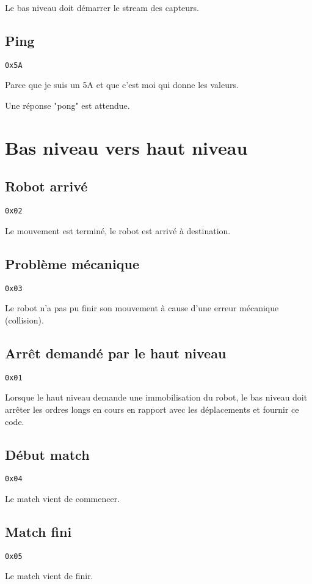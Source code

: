 \documentclass[a4paper, 12pt]{article}
\begin{document}
Le bas niveau doit démarrer le stream des capteurs.
    
\subsection{Ping}
    \texttt{0x5A}
    
    Parce que je suis un 5A et que c'est moi qui donne les valeurs.
    
    Une réponse "pong" est attendue.

\section{Bas niveau vers haut niveau}

\subsection{Robot arrivé}
    \texttt{0x02}
    
Le mouvement est terminé, le robot est arrivé à destination.
    
\subsection{Problème mécanique}
    \texttt{0x03}
    
Le robot n'a pas pu finir son mouvement à cause d'une erreur mécanique (collision).

\subsection{Arrêt demandé par le haut niveau}
    \texttt{0x01}
    
Lorsque le haut niveau demande une immobilisation du robot, le bas niveau doit arrêter les ordres longs en cours en rapport avec les déplacements et fournir ce code.
    
\subsection{Début match}
    \texttt{0x04}

Le match vient de commencer.
    
\subsection{Match fini}
    \texttt{0x05}
    
Le match vient de finir.
    
\end{document}
